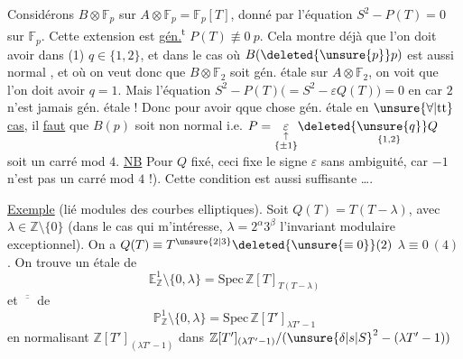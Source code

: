 Considérons   $B\otimes\mathbb F_p$ sur $A\otimes\mathbb F_p=\mathbb F_p[T]$, donné par l'équation \quad $S^2-P(T)=0$  sur $\mathbb F_p$.  Cette extension est \uline{gén.}\textsuperscript{t}   $P(T)\not\equiv0\ p$. Cela montre déjà que  l'on doit avoir dans (1) $q\in\{1,2\}$, et dans le cas où $B(\deleted{\unsure{p}}p)$ est aussi normal , et où on veut donc que $B\otimes\mathbb F_2$ soit gén. étale sur $A\otimes\mathbb F_2$, on voit que l'on doit avoir $q=1$. Mais l'équation $S^2-P(T)\bigl(=S^2-\varepsilon Q(T)\bigr)=0$ en car $2$ n'est jamais gén. étale ! Donc  pour avoir qque chose gén. étale en \uline{$\unsure{\forall|\mathrm{tt}}$ cas}, il \uline{faut} que $B(p)$ soit non normal i.e.  $P=\underset{\substack{\uparrow\\\{\pm1\}}}{\varepsilon}\deleted{\underset{\{1,2\}}{\unsure{q}}}Q$ soit un carré mod $4$. \uline{NB} Pour $Q$ fixé, ceci fixe le signe $\varepsilon$ sans ambiguité, car $-1$ n'est pas un carré mod $4$ !). Cette condition est aussi suffisante \ldots.

\uline{Exemple} (lié  modules des courbes elliptiques). Soit $Q(T)=T(T-\lambda)$, avec $\lambda\in\mathbb Z\setminus\{0\}$ (dans le cas qui m'intéresse, \deleted{$\lambda$} $\lambda=2^\alpha3^\beta$ l'invariant modulaire exceptionnel). On a $Q(T)\equiv T^{\unsure{2|3}}\deleted{\unsure{\equiv0}}(2)$  $\lambda\equiv0\ (4)$. On trouve un  étale de
\[
\mathbb E^1_{\mathbb Z}\setminus\{0,\lambda\}=\mathrm{Spec}\,\mathbb Z[T]_{T(T-\lambda)}
\]
et $\overline{\overline{\phantom{m}}}$ de
\[
\mathbb P^1_{\mathbb Z}\setminus\{0,\lambda\}=\mathrm{Spec}\,\mathbb Z[T']_{\lambda T'-1}
\]
en normalisant $\mathbb Z[T']_{(\lambda T'-1)}$ dans $\mathbb Z[T']_{(\lambda T'-1)}/(\unsure{\delta|s|S}^2-(\lambda T'-1))$
